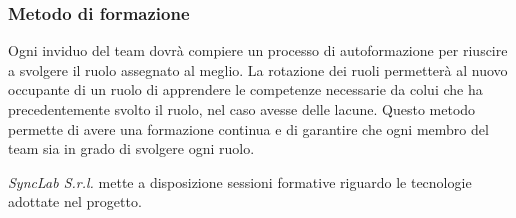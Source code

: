 \subsubsection{Metodo di formazione}
Ogni inviduo del team dovrà compiere un processo di autoformazione per riuscire a svolgere il ruolo assegnato al meglio. La rotazione dei ruoli permetterà al nuovo occupante di un ruolo di apprendere le competenze necessarie da colui che ha precedentemente svolto il ruolo, nel caso avesse delle lacune. Questo metodo permette di avere una formazione continua e di garantire che ogni membro del team sia in grado di svolgere ogni ruolo.

\textit{SyncLab S.r.l.} mette a disposizione sessioni formative riguardo le tecnologie adottate nel progetto.